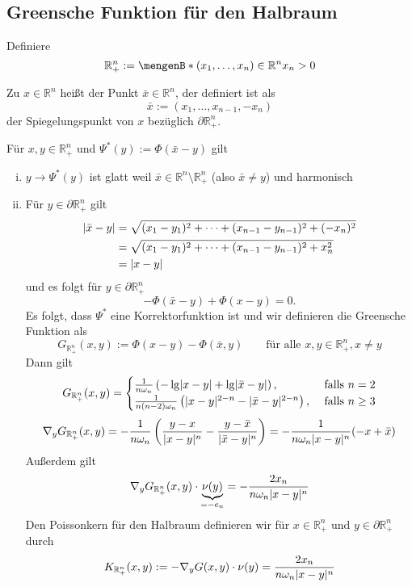 
\subsection*{Greensche Funktion für den Halbraum} 
\label{sec:section_name}
Definiere 
\[
	\mathbb{R}^n_+ := \set[(x_1,\dots,x_n) \in \mathbb{R}^n]{x_n > 0}
\]

\begin{definition}
	Zu $x \in \mathbb{R}^n$ heißt der Punkt $\bar{x} \in \mathbb{R}^n$, der definiert ist als 
	\[
		\bar{x} := (x_1, \dots, x_{n-1},-x_n) 
	\]
	der Spiegelungspunkt von $x$ bezüglich $\partial \mathbb{R}^n_+$. 
\end{definition}
	Für $x,y \in \mathbb{R}^n_+$ und $\Psi^*(y):= \Phi(\bar{x}-y)$ gilt
	\begin{enumerate}[(i)]
		\item $y \to \Psi^*(y)$ ist glatt weil $\bar{x} \in \mathbb{R}^n \setminus \mathbb{R}^n_+$ (also $\bar{x} \neq y$) und harmonisch
		\item Für $y \in \partial \mathbb{R}^n_+$ gilt
		\begin{align*}
			\lvert\bar{x}-y\rvert &= \sqrt{(x_1-y_1)^2+ \dots + (x_{n-1}-y_{n-1})^2 + (-x_n)^2} \\
			&= \sqrt{(x_1-y_1)^2+ \dots + (x_{n-1}-y_{n-1})^2 + x_n^2} \\
			&= \lvert x-y\rvert
		\end{align*}
		und es folgt für $y \in \partial \mathbb{R}^n_+$ \[
			-\Phi(\bar{x}-y)+  \Phi(x-y) = 0.
		\] 
		Es folgt, dass $\Psi^*$ eine Korrektorfunktion ist und wir definieren die Greensche Funktion als
		\[
			G_{\mathbb{R}^n_+}(x,y) := \Phi(x-y) - \Phi(\bar{x},y) \qquad \text{für alle }x,y \in \mathbb{R}^n_+, x \neq y
		\]
		Dann gilt
		\[
				G_{\mathbb{R}^n_+}(x,y) = \begin{cases}
					\frac{1}{n \omega_n} \left( -  \lg \lvert x-y\rvert + \lg \lvert\bar{x}-y\rvert \right), &\text{ falls }n=2\\
					\frac{1}{n(n-2)\omega_n} \left( \lvert x-y\rvert^{2-n}- \lvert\bar{x}-y\rvert^{2-n} \right), &\text{ falls }n \geq 3
				\end{cases}
		\]
		\[
			 \nabla_y G_{\mathbb{R}^n_+}(x,y) = - \frac{1}{n \omega_n} \left( \frac{y-x}{\lvert x-y\rvert^n} - \frac{y - \bar{x}}{\lvert\bar{x}-y\rvert^n} \right)
			 = - \frac{1}{n \omega_n \lvert x-y\rvert^n} (-x + \bar{x})
		\]
		Außerdem gilt
		\[
			  \nabla_y G_{\mathbb{R}^n_+}(x,y) \cdot \underset{=-e_n}{\underbrace{\nu(y)}} = - \frac{2 x_n}{n \omega_n \lvert x-y\rvert^n}
		\]
		Den Poissonkern für den Halbraum definieren wir für $x \in \mathbb{R}^n_+$ und $y \in  \partial \mathbb{R}^n_+$ durch
		\[
			K_{\mathbb{R}^n_+}(x,y) := -  \nabla_y G(x,y) \cdot \nu(y) = \frac{2x_n}{n \omega_n \lvert x-y\rvert^n}
		\]
	\end{enumerate}

